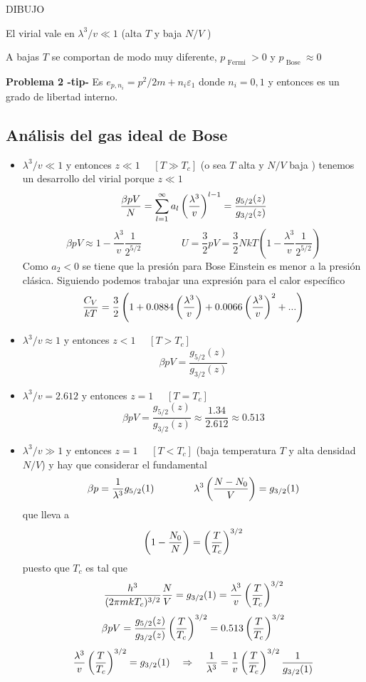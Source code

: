 \documentclass[10pt,oneside]{CBFT_book}
\begin{document}
DIBUJO 

El virial vale en $\lambda^3/v \ll 1$ (alta $T$ y baja $N/V$ )

A bajas $T$ se comportan de modo muy diferente, $p_{\text{ Fermi }} > 0 $ y
$p_{\text{ Bose }} \approx 0$

\begin{ejemplo}{\bf Problema 2 -tip-}
Es $e_{p,n_i} = p^2/ 2m + n_i \varepsilon_1 $ donde $n_i=0,1$ y entonces es un grado de libertad interno.
 
\end{ejemplo}


\subsection{Análisis del gas ideal de Bose}

\begin{itemize}
 \item $ \lambda^3 / v \ll 1 $ y entonces $ z \ll 1 $ $\quad  [T \gg T_c ] $ (o sea $T$ alta y $N/V$ baja )
 tenemos un desarrollo del virial porque $z \ll 1$
 \[
	\frac{\beta p V}{N} = \sum_{l=1}^\infty a_l \left( \frac{ \lambda^3 }{ v } \right)^{l-1} = \frac{ g_{5/2}(z) }{ g_{3/2}(z) }
 \]
 \[
	\beta p V \approx 1 - \frac{\lambda^3}{v} \frac{1}{2^{5/2}} \qquad \qquad 
	U = \frac{3}{2}pV = \frac{3}{2} NkT \left( 1 - \frac{\lambda^3}{v} \frac{1}{2^{5/2}} \right)
 \]
 Como $a_2 < 0$ se tiene que la presión para Bose Einstein es menor a la presión clásica. Siguiendo
 podemos trabajar una expresión para el calor específico
 \[
	\frac{C_V}{kT} = \frac{3}{2} \left( 1 + 0.0884 \left( \frac{ \lambda^3 }{ v } \right) + 
	0.0066 \left( \frac{ \lambda^3 }{ v } \right)^2 + ... \right)
 \]
 
 \item $ \lambda^3 / v \approx 1 $ y entonces $ z < 1 $ $\quad  [T > T_c ] $
 \[
	\beta p V = \frac{ g_{5/2}(z) }{ g_{3/2}(z) }
 \]
 \item  $ \lambda^3 / v = 2.612 $ y entonces $ z = 1 $ $\quad  [T = T_c ] $
 \[
	\beta p V = \frac{ g_{5/2}(z) }{ g_{3/2}(z) } \approx \frac{1.34}{2.612} \approx 0.513
 \]
 \item $ \lambda^3 / v \gg 1 $ y entonces $ z = 1 $ $\quad  [T < T_c ] $ (baja temperatura $T$ y alta
 densidad $N/V$) y hay que considerar el  fundamental
 \[
	\beta p = \frac{1}{\lambda^3} g_{5/2}(1) \qquad \qquad \lambda^3\left( \frac{ N-N_0 }{ V } \right) = g_{3/2}(1)
 \]
 que lleva a 
 \[
	\left( 1 - \frac{N_0}{N} \right) = \left( \frac{ T }{ T_c } \right)^{3/2}
 \]
 puesto que $T_c$ es tal que 
 \[
	\frac{h^3}{(2\pi m kT_c)^{3/2}} \frac{N}{V} = g_{3/2}(1) = \frac{\lambda^3}{v}\left( \frac{ T }{ T_c } \right)^{3/2}
 \]
 \[
	\beta p V = \frac{ g_{5/2}(z) }{ g_{3/2}(z) } \left( \frac{ T }{ T_c } \right)^{3/2} = 0.513 \left( \frac{ T }{ T_c } \right)^{3/2}
 \]
 \[
	\frac{\lambda^3}{v} \left( \frac{ T }{ T_c } \right)^{3/2} = g_{3/2}(1) \quad \Rightarrow \quad \frac{1}{\lambda^3} =
	\frac{1}{v}\left( \frac{ T }{ T_c } \right)^{3/2} \frac{1}{g_{3/2}(1)}
 \]
\end{itemize}
\end{document}
